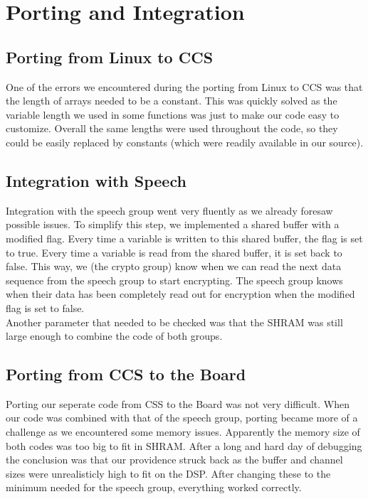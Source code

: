 \documentclass[a4paper]{article}
\begin{document}
\section{Porting and Integration}

\subsection{Porting from Linux to CCS}

One of the errors we encountered during the porting from Linux to CCS was that the length of arrays needed to be a constant. This was quickly solved as the variable length we used in some functions was just to make our code easy to customize. Overall the same lengths were used throughout the code, so they could be easily replaced by constants (which were readily available in our source).

\subsection{Integration with Speech}

Integration with the speech group went very fluently as we already foresaw possible issues. To simplify this step, we implemented a shared buffer with a modified flag. Every time a variable is written to this shared buffer, the flag is set to true. Every time a variable is read from the shared buffer, it is set back to false. This way, we (the crypto group) know when we can read the next data sequence from the speech group to start encrypting. The speech group knows when their data has been completely read out for encryption when the modified flag is set to false.\\

Another parameter that needed to be checked was that the SHRAM was still large enough to combine the code of both groups.

\subsection{Porting from CCS to the Board}

Porting our seperate code from CSS to the Board was not very difficult. When our code was combined with that of the speech group, porting became more of a challenge as we encountered some memory issues. Apparently the memory size of both codes was too big to fit in SHRAM. After a long and hard day of debugging the conclusion was that our providence struck back as the buffer and channel sizes were unrealisticly high to fit on the DSP. After changing these to the minimum needed for the speech group, everything worked correctly.\\
\end{document}
